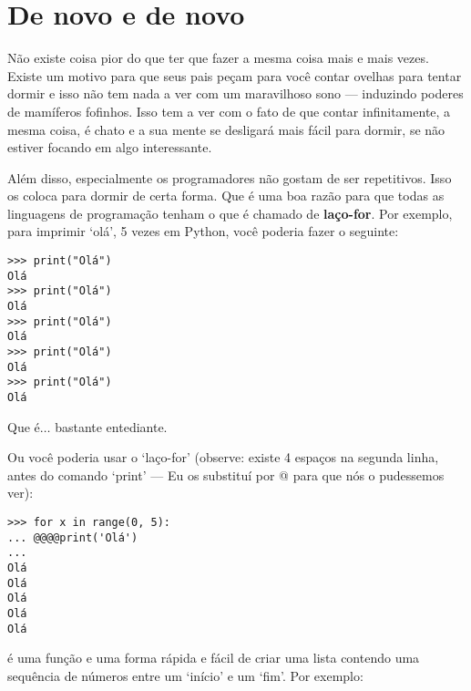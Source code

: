 

\chapter{De novo e de novo}\label{ch:againandagain}

Não existe coisa pior do que ter que fazer a mesma coisa mais e mais vezes. Existe um motivo para que seus pais peçam para você contar ovelhas para tentar dormir e isso não tem nada a ver com um maravilhoso sono --- induzindo poderes de mamíferos fofinhos. Isso tem a ver com o fato de que contar infinitamente, a mesma coisa, é chato e a sua mente se desligará mais fácil para dormir, se não estiver focando em algo interessante.
\par
Além disso, especialmente os programadores não gostam de ser repetitivos. Isso os coloca para dormir de certa forma. Que é uma boa razão para que todas as linguagens de programação tenham o que é chamado de \textbf{laço-for}. Por exemplo, para imprimir `olá', 5 vezes em Python, você poderia fazer o seguinte:

\begin{listing}
\begin{verbatim}
>>> print("Olá")
Olá
>>> print("Olá")
Olá
>>> print("Olá")
Olá
>>> print("Olá")
Olá
>>> print("Olá")
Olá
\end{verbatim}
\end{listing}

Que é$\ldots$ bastante entediante.

Ou você poderia usar o `laço-for' (observe: existe 4 espaços na segunda linha, antes do comando `print' --- Eu os substituí por @ para que nós o pudessemos ver):

\begin{listingignore}
\begin{verbatim}
>>> for x in range(0, 5):
... @@@@print('Olá')
... 
Olá
Olá
Olá
Olá
Olá
\end{verbatim}
\end{listingignore}

 é uma função e uma forma rápida e fácil de criar uma lista contendo uma sequência de números entre um `início' e um `fim'. Por exemplo:

